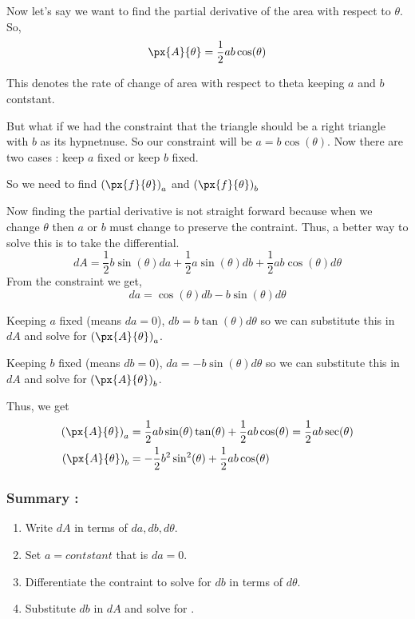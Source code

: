 Now let's say we want to find the partial derivative of the area with respect to $\theta$. So, 
$$ \px{A}{\theta} = \frac{1}{2} a b \cos(\theta) $$

This denotes the rate of change of area with respect to theta keeping $a$ and $b$ contstant.

But what if we had the constraint that the triangle should be a right triangle with $b$ as its hypnetnuse.
So our constraint will be $a = b \cos(\theta)$.
Now there are two cases : keep $a$ fixed or keep $b$ fixed.

So we need to find $ \left( \px{f}{\theta} \right)_a $ and $ \left( \px{f}{\theta} \right)_b $

Now finding the partial derivative is not straight forward because when we change $\theta$ then $a$ or $b$ must change to preserve the contraint.
Thus, a better way to solve this is to take the differential.
$$ dA = \frac{1}{2} b \sin(\theta) da + \frac{1}{2} a \sin(\theta) db + \frac{1}{2} a b \cos(\theta) d\theta $$
From the constraint we get, $$ da = \cos(\theta) db - b \sin(\theta) d\theta $$

Keeping $a$ fixed (means $da = 0$), $db = b\tan(\theta)d\theta$ so we can substitute this in $dA$ and solve for $\left( \px{A}{\theta} \right)_a$.

Keeping $b$ fixed (means $db = 0$), $da = - b\sin(\theta)d\theta$ so we can substitute this in $dA$ and solve for $\left( \px{A}{\theta} \right)_b$.

Thus, we get 
\begin{align*}
\left( \px{A}{\theta} \right)_a & = \frac{1}{2} a b \sin(\theta)\tan(\theta) + \frac{1}{2} a b \cos(\theta) = \frac{1}{2} a b \sec(\theta) \\ 
\left( \px{A}{\theta} \right)_b & = - \frac{1}{2} b^2 \sin^2(\theta) + \frac{1}{2} a b \cos(\theta) 
\end{align*}


\subsubsection{Summary : }
\begin{enumerate}
    \item Write $dA$ in terms of $da, db, d\theta$.
    \item Set $a = contstant$ that is $da = 0$.
    \item Differentiate the contraint to solve for $db$ in terms of $d\theta$.
    \item Substitute $db$ in $dA$ and solve for .
\end{enumerate}


